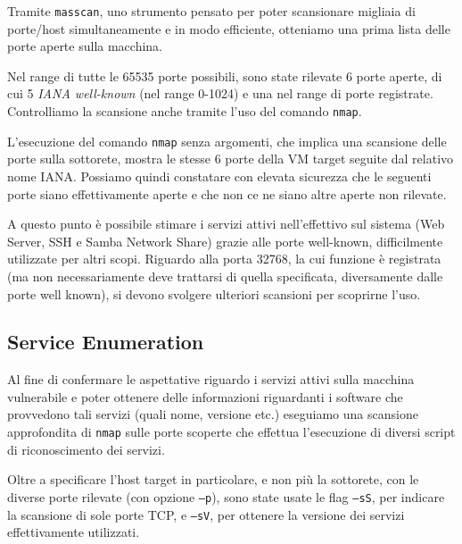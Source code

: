 \documentclass[12pt, a4paper]{article}
\begin{document}
	Tramite \texttt{masscan}\cite{masscan}, uno strumento pensato per poter scansionare migliaia di porte/host simultaneamente e in modo efficiente, otteniamo una prima lista delle porte aperte sulla macchina.
	
	
	Nel range di tutte le 65535 porte possibili, sono state rilevate 6 porte aperte, di cui 5 \emph{IANA well-known} (nel range 0-1024) e una nel range di porte registrate.
	Controlliamo la scansione anche tramite l'uso del comando \texttt{nmap}.
	
	
	L'esecuzione del comando \texttt{nmap} senza argomenti, che implica una scansione delle porte sulla sottorete, mostra le stesse 6 porte della VM target seguite dal relativo nome IANA. Possiamo quindi constatare con elevata sicurezza che le seguenti porte siano effettivamente aperte e che non ce ne siano altre aperte non rilevate.
	
	A questo punto è possibile stimare i servizi attivi nell'effettivo sul sistema (Web Server, SSH e Samba Network Share) grazie alle porte well-known, difficilmente utilizzate per altri scopi. Riguardo alla porta 32768, la cui funzione è registrata (ma non necessariamente deve trattarsi di quella specificata, diversamente dalle porte well known), si devono svolgere ulteriori scansioni per scoprirne l'uso.
	
	\subsection{Service Enumeration}
	Al fine di confermare le aspettative riguardo i servizi attivi sulla macchina vulnerabile e poter ottenere delle informazioni riguardanti i software che provvedono tali servizi (quali nome, versione etc.) eseguiamo una scansione approfondita di \texttt{nmap} sulle porte scoperte che effettua l'esecuzione di diversi script di riconoscimento dei servizi.
	
	
	Oltre a specificare l'host target in particolare, e non più la sottorete, con le diverse porte rilevate (con opzione \texttt{--p}), sono state usate le flag \texttt{--sS}, per indicare la scansione di sole porte TCP, e \texttt{--sV}, per ottenere la versione dei servizi effettivamente utilizzati.
	
\end{document}
